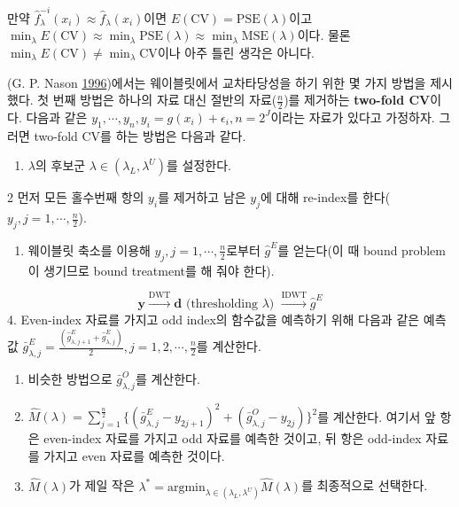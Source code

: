 \documentclass[b5paper,]{book}
\providecommand{\tightlist}{%
  \setlength{\itemsep}{0pt}\setlength{\parskip}{0pt}}
\theoremstyle{definition}
\theoremstyle{definition}
\theoremstyle{definition}
\theoremstyle{remark}
\begin{document}
만약
\(\hat{f}_{\lambda}^{-i}(x_{i}) \approx \hat{f}_{\lambda}(x_{i})\)이면
\(E(\text{CV})=\text{PSE}(\lambda)\)이고
\(\min_{\lambda}E(\text{CV}) \approx \min_{\lambda}\text{PSE}(\lambda) \approx \min_{\lambda}\text{MSE}(\lambda)\)이다.
물론 \(\min_{\lambda}E(\text{CV}) \neq \min_{\lambda}\text{CV}\)이나
아주 틀린 생각은 아니다.

(G. P. Nason \protect\hyperlink{ref-Nason1996}{1996})에서는 웨이블릿에서
교차타당성을 하기 위한 몇 가지 방법을 제시했다. 첫 번째 방법은 하나의
자료 대신 절반의 자료(\(\frac{n}{2}\))를 제거하는
\textbf{two-fold CV}이다. 다음과 같은
\(y_{1}, \cdots, y_{n}, y_{i}=g(x_{i})+\epsilon_{i}, n=2^{J}\)이라는
자료가 있다고 가정하자. 그러면 two-fold CV를 하는 방법은 다음과 같다.

\begin{enumerate}
\def\labelenumi{\arabic{enumi}.}
\tightlist
\item
  \(\lambda\)의 후보군 \(\lambda \in (\lambda_{L}, \lambda^{U})\)를
  설정한다.
\end{enumerate}

2 먼저 모든 홀수번째 항의 \(y_{i}\)를 제거하고 남은 \(y_{j}\)에 대해
re-index를 한다(\(y_{j},j=1,\cdots,\frac{n}{2}\)).

\begin{enumerate}
\def\labelenumi{\arabic{enumi}.}
\setcounter{enumi}{2}
\tightlist
\item
  웨이블릿 축소를 이용해 \(y_{j},j=1,\cdots,\frac{n}{2}\)로부터
  \(\hat{g}^{E}\)를 얻는다(이 때 bound problem이 생기므로 bound
  treatment를 해 줘야 한다).
\end{enumerate}

\[\mathbf{y} \xrightarrow{\text{DWT}} \mathbf{d} \text{ (thresholding $\lambda$) } \xrightarrow{\text{IDWT}}  \hat{g}^{E}\]
4. Even-index 자료를 가지고 odd index의 함수값을 예측하기 위해 다음과
같은 예측값
\(\bar{g}_{\lambda,j}^{E}=\frac{(\hat{g}_{\lambda,j+1}^{E}+\hat{g}_{\lambda,j}^{E})}{2}, j=1,2,\cdots,\frac{n}{2}\)를
계산한다.

\begin{enumerate}
\def\labelenumi{\arabic{enumi}.}
\setcounter{enumi}{4}
\item
  비슷한 방법으로 \(\bar{g}_{\lambda,j}^{O}\)를 계산한다.
\item
  \(\hat{M}(\lambda)=\sum_{j=1}^{\frac{n}{2}}\{(\bar{g}_{\lambda,j}^{E}-y_{2j+1})^{2}+(\bar{g}_{\lambda,j}^{O}-y_{2j})\}^{2}\)를
  계산한다. 여기서 앞 항은 even-index 자료를 가지고 odd 자료를 예측한
  것이고, 뒤 항은 odd-index 자료를 가지고 even 자료를 예측한 것이다.
\item
  \(\hat{M}(\lambda)\)가 제일 작은
  \(\lambda^{*}=\text{argmin}_{\lambda \in (\lambda_{L},\lambda^{U})} \hat{M}(\lambda)\)를
  최종적으로 선택한다.
\end{enumerate}
\end{document}
